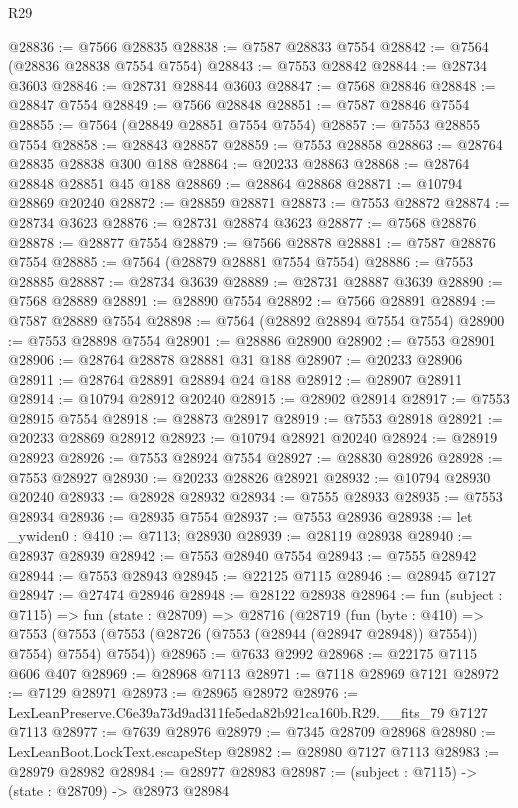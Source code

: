 \begin{lexlean}{R29}
\begin{coremodule}
@28836 := @7566 @28835
@28838 := @7587 @28833 @7554
@28842 := @7564 (@28836 @28838 @7554 @7554)
@28843 := @7553 @28842
@28844 := @28734 @3603
@28846 := @28731 @28844 @3603
@28847 := @7568 @28846
@28848 := @28847 @7554
@28849 := @7566 @28848
@28851 := @7587 @28846 @7554
@28855 := @7564 (@28849 @28851 @7554 @7554)
@28857 := @7553 @28855 @7554
@28858 := @28843 @28857
@28859 := @7553 @28858
@28863 := @28764 @28835 @28838 @300 @188
@28864 := @20233 @28863
@28868 := @28764 @28848 @28851 @45 @188
@28869 := @28864 @28868
@28871 := @10794 @28869 @20240
@28872 := @28859 @28871
@28873 := @7553 @28872
@28874 := @28734 @3623
@28876 := @28731 @28874 @3623
@28877 := @7568 @28876
@28878 := @28877 @7554
@28879 := @7566 @28878
@28881 := @7587 @28876 @7554
@28885 := @7564 (@28879 @28881 @7554 @7554)
@28886 := @7553 @28885
@28887 := @28734 @3639
@28889 := @28731 @28887 @3639
@28890 := @7568 @28889
@28891 := @28890 @7554
@28892 := @7566 @28891
@28894 := @7587 @28889 @7554
@28898 := @7564 (@28892 @28894 @7554 @7554)
@28900 := @7553 @28898 @7554
@28901 := @28886 @28900
@28902 := @7553 @28901
@28906 := @28764 @28878 @28881 @31 @188
@28907 := @20233 @28906
@28911 := @28764 @28891 @28894 @24 @188
@28912 := @28907 @28911
@28914 := @10794 @28912 @20240
@28915 := @28902 @28914
@28917 := @7553 @28915 @7554
@28918 := @28873 @28917
@28919 := @7553 @28918
@28921 := @20233 @28869 @28912
@28923 := @10794 @28921 @20240
@28924 := @28919 @28923
@28926 := @7553 @28924 @7554
@28927 := @28830 @28926
@28928 := @7553 @28927
@28930 := @20233 @28826 @28921
@28932 := @10794 @28930 @20240
@28933 := @28928 @28932
@28934 := @7555 @28933
@28935 := @7553 @28934
@28936 := @28935 @7554
@28937 := @7553 @28936
@28938 := let _ywiden0 : @410 := @7113; @28930
@28939 := @28119 @28938
@28940 := @28937 @28939
@28942 := @7553 @28940 @7554
@28943 := @7555 @28942
@28944 := @7553 @28943
@28945 := @22125 @7115
@28946 := @28945 @7127
@28947 := @27474 @28946
@28948 := @28122 @28938
@28964 := fun (subject : @7115) =>
  fun (state : @28709) =>
  @28716
    (@28719
      (fun (byte : @410) =>
      @7553 (@7553 (@7553 (@28726 (@7553 (@28944 (@28947 @28948)) @7554)) @7554) @7554) @7554))
@28965 := @7633 @2992
@28968 := @22175 @7115 @606 @407
@28969 := @28968 @7113
@28971 := @7118 @28969 @7121
@28972 := @7129 @28971
@28973 := @28965 @28972
@28976 := LexLeanPreserve.C6e39a73d9ad311fe5eda82b921ca160b.R29.__fits_79 @7127 @7113
@28977 := @7639 @28976
@28979 := @7345 @28709 @28968
@28980 := LexLeanBoot.LockText.escapeStep
@28982 := @28980 @7127 @7113
@28983 := @28979 @28982
@28984 := @28977 @28983
@28987 := (subject : @7115) -> (state : @28709) -> @28973 @28984

\end{coremodule}
\end{lexlean}
